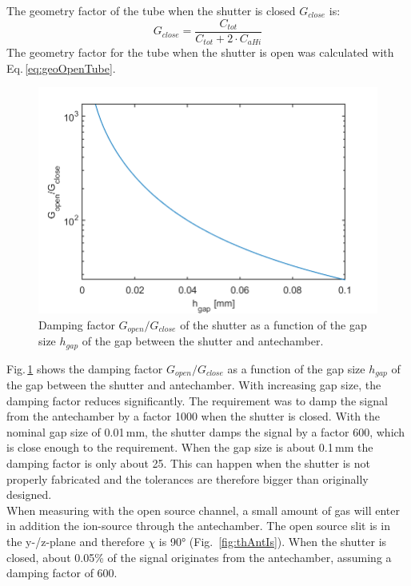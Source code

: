 	The geometry factor of the tube when the shutter is closed $G_{close}$ is:
	\begin{equation}
		G_{close} = \frac{C_{tot}}{C_{tot} + 2\cdot C_{aHi}}
	\end{equation}
	The geometry factor for the tube when the shutter is open was calculated with Eq.\,\eqref{eq:geoOpenTube}.\\
	\begin{figure}[h]
		\centering
		\includegraphics[width=.8\textwidth]{Bilder/ShutGapSizeSigDamp.png}
		\caption{Damping factor $G_{open}/G_{close}$ of the shutter as a function of the gap size $h_{gap}$ of the gap between the shutter and antechamber.}
		\label{fig:ShutGapSizeSigDamp}
	\end{figure}
	Fig.\,\ref{fig:ShutGapSizeSigDamp} shows the damping factor $G_{open}/G_{close}$ as a function of the gap size $h_{gap}$ of the gap between the shutter and antechamber. With increasing gap size, the damping factor reduces significantly. The requirement was to damp the signal from the antechamber by a factor 1000 when the shutter is closed. With the nominal gap size of 0.01\,mm, the shutter damps the signal by a factor 600, which is close enough to the requirement. When the gap size is about 0.1\,mm the damping factor is only about 25. This can happen when the shutter is not properly fabricated and the tolerances are therefore bigger than originally designed.\\
	When measuring with the open source channel, a small amount of gas will enter in addition the ion-source through the antechamber. The open source slit is in the y-/z-plane and therefore $\chi$ is 90° (Fig.~\ref{fig:thAntIs}). When the shutter is closed, about 0.05\% of the signal originates from the antechamber, assuming a damping factor of 600.
	

